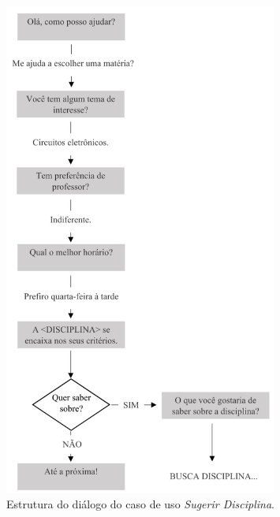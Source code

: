 \documentclass[]{politex}
\begin{document}
\begin{figure}[h]
    \centering
    \includegraphics[width=0.8\textwidth]{images/anexo/asm-suggestion.png}
    \caption{Estrutura do diálogo do caso de uso \textit{Sugerir Disciplina}.}
    \label{fig:asm_recommendation}
\end{figure}
\end{document}
